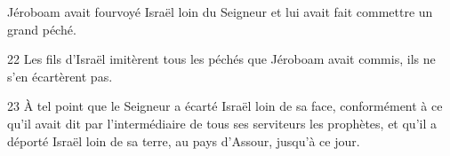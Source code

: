 Jéroboam avait fourvoyé Israël loin du Seigneur et lui avait fait commettre un grand péché.


22 Les fils d’Israël imitèrent tous les péchés que Jéroboam avait commis, ils ne s’en écartèrent pas.

23 À tel point que le Seigneur a écarté Israël loin de sa face, conformément à ce qu’il avait dit par l’intermédiaire de tous ses serviteurs les prophètes, et qu’il a déporté Israël loin de sa terre, au pays d’Assour, jusqu’à ce jour.